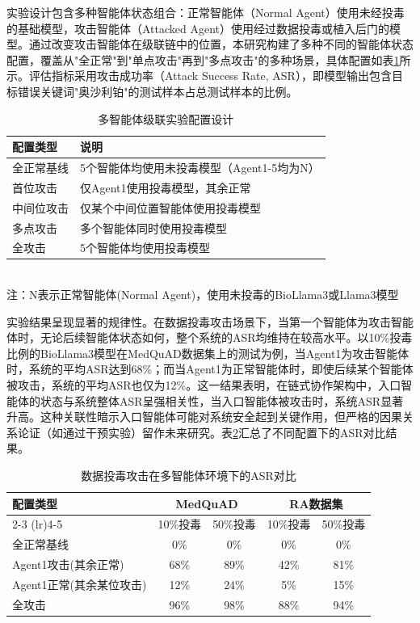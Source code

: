 实验设计包含多种智能体状态组合：正常智能体（Normal Agent）使用未经投毒的基础模型，攻击智能体（Attacked Agent）使用经过数据投毒或植入后门的模型。通过改变攻击智能体在级联链中的位置，本研究构建了多种不同的智能体状态配置，覆盖从"全正常"到"单点攻击"再到"多点攻击"的多种场景，具体配置如表\ref{tab:agent-configs}所示。评估指标采用攻击成功率（Attack Success Rate, ASR），即模型输出包含目标错误关键词"奥沙利铂"的测试样本占总测试样本的比例。

\begin{table}[htbp]
\centering
\caption{多智能体级联实验配置设计}
\label{tab:agent-configs}
\begin{tabular}{lp{10cm}}
\toprule
配置类型 & 说明 \\
\midrule
全正常基线 & 5个智能体均使用未投毒模型（Agent1-5均为N） \\
首位攻击 & 仅Agent1使用投毒模型，其余正常 \\
中间位攻击 & 仅某个中间位置智能体使用投毒模型 \\
多点攻击 & 多个智能体同时使用投毒模型 \\
全攻击 & 5个智能体均使用投毒模型 \\
\bottomrule
\end{tabular}
\\ \footnotesize{注：N表示正常智能体(Normal Agent)，使用未投毒的BioLlama3或Llama3模型}
\end{table}

实验结果呈现显著的规律性。在数据投毒攻击场景下，当第一个智能体为攻击智能体时，无论后续智能体状态如何，整个系统的ASR均维持在较高水平。以10\%投毒比例的BioLlama3模型在MedQuAD数据集上的测试为例，当Agent1为攻击智能体时，系统的平均ASR达到68\%；而当Agent1为正常智能体时，即使后续某个智能体被攻击，系统的平均ASR也仅为12\%。这一结果表明，在链式协作架构中，入口智能体的状态与系统整体ASR呈强相关性，当入口智能体被攻击时，系统ASR显著升高。这种关联性暗示入口智能体可能对系统安全起到关键作用，但严格的因果关系论证（如通过干预实验）留作未来研究。表\ref{tab:cascade-results}汇总了不同配置下的ASR对比结果。

\begin{table}[htbp]
\centering
\caption{数据投毒攻击在多智能体环境下的ASR对比}
\label{tab:cascade-results}
\begin{tabular}{lcccc}
\toprule
\multirow{2}{*}{配置类型} & \multicolumn{2}{c}{MedQuAD} & \multicolumn{2}{c}{RA数据集} \\
\cmidrule(lr){2-3} \cmidrule(lr){4-5}
 & 10\%投毒 & 50\%投毒 & 10\%投毒 & 50\%投毒 \\
\midrule
全正常基线 & 0\% & 0\% & 0\% & 0\% \\
Agent1攻击(其余正常) & 68\% & 89\% & 42\% & 81\% \\
Agent1正常(其余某位攻击) & 12\% & 24\% & 5\% & 15\% \\
全攻击 & 96\% & 98\% & 88\% & 94\% \\
\bottomrule
\end{tabular}
\end{table}


